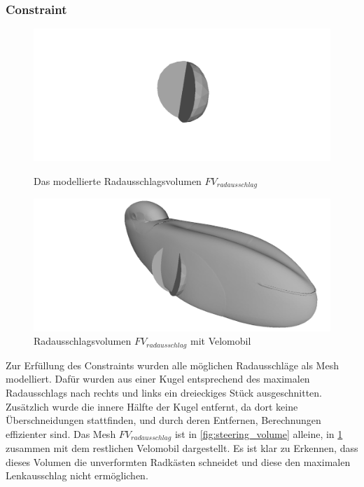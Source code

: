 \subsubsection{Constraint}
\begin{figure}[h]
	\centering
	\begin{minipage}{0.45\textwidth}
		\centering
		\includegraphics[width=1\linewidth]{bilder/radausschlag.png}
		\caption{Das modellierte Radausschlagsvolumen $FV_{radausschlag}$}
		\label{fig:steering_volume}
	\end{minipage}\hfill
	\begin{minipage}{0.45\textwidth}
		\centering
		\includegraphics[width=1\linewidth]{bilder/radausschlag_inclVelo.png}
		\caption{Radausschlagsvolumen $FV_{radausschlag}$ mit Velomobil}
		\label{fig:steering_volume_with_velo}
	\end{minipage}
\end{figure}
Zur Erfüllung des Constraints wurden alle möglichen Radausschläge als Mesh modelliert.
Dafür wurden aus einer Kugel entsprechend des maximalen Radausschlags nach rechts und links ein dreieckiges Stück ausgeschnitten.
Zusätzlich wurde die innere Hälfte der Kugel entfernt, da dort keine Überschneidungen stattfinden, und durch deren Entfernen, Berechnungen effizienter sind.
Das Mesh $FV_{radausschlag}$ ist in \cref{fig:steering_volume} alleine, in \cref{fig:steering_volume_with_velo} zusammen mit dem restlichen Velomobil dargestellt.
Es ist klar zu Erkennen, dass dieses Volumen die unverformten Radkästen schneidet und diese den maximalen Lenkausschlag nicht ermöglichen.
 

